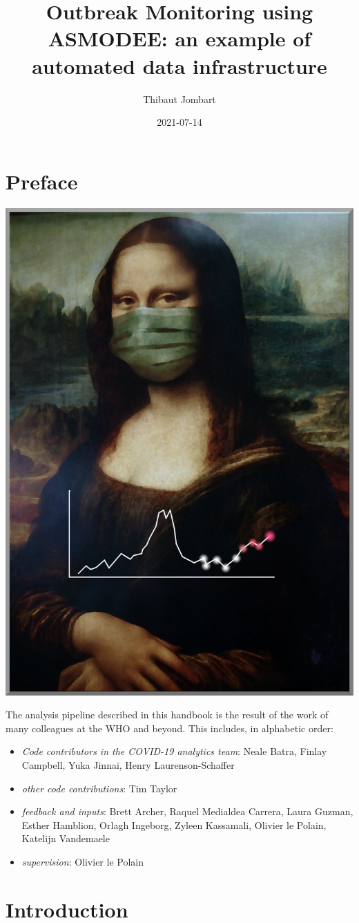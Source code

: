 \documentclass[]{book}
\title{Outbreak Monitoring using ASMODEE: an example of automated data infrastructure}
\author{Thibaut Jombart}
\date{2021-07-14}
\begin{document}
\maketitle

{
\setcounter{tocdepth}{1}
\tableofcontents
}
\hypertarget{preface}{%
\chapter*{Preface}\label{preface}}

\begin{center}\includegraphics[width=0.4\linewidth]{images/cover} \end{center}

The analysis pipeline described in this handbook is the result of the work of
many colleagues at the WHO and beyond. This includes, in alphabetic order:

\begin{itemize}
\item
  \emph{Code contributors in the COVID-19 analytics team}: Neale Batra, Finlay
  Campbell, Yuka Jinnai, Henry Laurenson-Schaffer
\item
  \emph{other code contributions}: Tim Taylor
\item
  \emph{feedback and inputs}: Brett Archer, Raquel Medialdea Carrera, Laura Guzman,
  Esther Hamblion, Orlagh Ingeborg, Zyleen Kassamali, Olivier le Polain,
  Katelijn Vandemaele
\item
  \emph{supervision}: Olivier le Polain
\end{itemize}

\hypertarget{intro}{%
\chapter{Introduction}\label{intro}}
\end{document}
